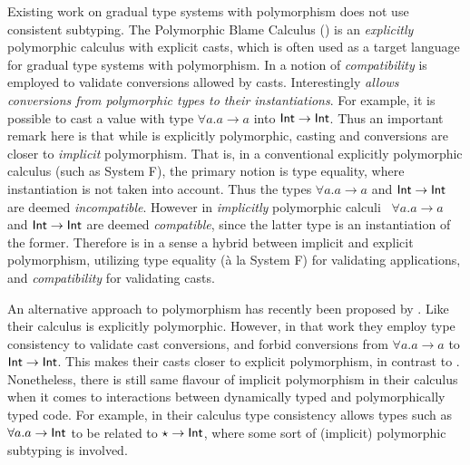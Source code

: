 Existing work on gradual type systems with polymorphism does not use
consistent subtyping. The Polymorphic Blame Calculus (\pbc) \cite{ahmed2011blame} is
an \emph{explicitly} polymorphic calculus with explicit casts, which is
often used as a target language for gradual type systems with
polymorphism. In \pbc a notion of \emph{compatibility} is employed
to validate conversions allowed by casts. Interestingly \emph{\pbc
  allows conversions from polymorphic types to their instantiations}.
For example, it is possible to cast a value with type
$\forall a. a \to a$ into $\mathsf{Int} \to \mathsf{Int}$. Thus an
important remark here is that while \pbc is explicitly polymorphic,
casting and conversions are closer to \emph{implicit}
polymorphism. That is, in a conventional explicitly polymorphic calculus
(such as System F), the primary notion is type equality, where
instantiation is not taken into account. Thus the types
$\forall a. a \to a$ and $\mathsf{Int} \to \mathsf{Int}$ are deemed
\emph{incompatible}. However in \emph{implicitly} polymorphic
calculi~\citep{jones2007practical,dunfield2013complete}
$\forall a. a \to a$ and $\mathsf{Int} \to \mathsf{Int}$ are deemed
\emph{compatible}, since the latter type is an instantiation of the
former.  Therefore \pbc is in a sense a hybrid between implicit and
explicit polymorphism, utilizing type equality (\`a la System F) for
validating applications, and \emph{compatibility} for validating
casts. 

An alternative approach to polymorphism has recently been proposed by
\citet{yuu2017poly}. Like \pbc their calculus is explicitly polymorphic.
However, in that work they employ type consistency to validate cast conversions,
and forbid conversions from $\forall a. a \to a$ to $\mathsf{Int} \to \mathsf{Int}$. This makes
their casts closer to explicit polymorphism, in contrast to \pbc. Nonetheless,
there is still same flavour of implicit polymorphism in their calculus when it
comes to interactions between dynamically typed and polymorphically typed code.
For example, in their calculus type consistency allows types such as $\forall a.
a \to \mathsf{Int}$ to be related to $\star \to \mathsf{Int}$, where some sort of (implicit)
polymorphic subtyping is involved.


